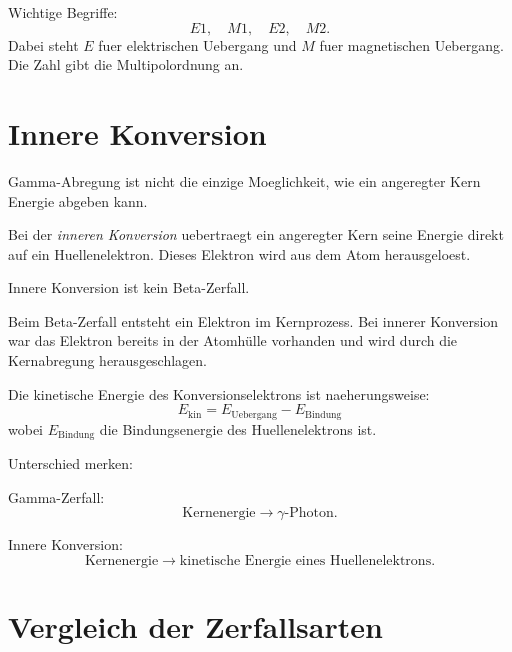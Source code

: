 \begin{examtipbox}
Wichtige Begriffe:
\[
    E1, \quad M1, \quad E2, \quad M2.
\]
Dabei steht $E$ fuer elektrischen Uebergang und $M$ fuer magnetischen Uebergang.
Die Zahl gibt die Multipolordnung an.
\end{examtipbox}

\section{Innere Konversion}

Gamma-Abregung ist nicht die einzige Moeglichkeit, wie ein angeregter Kern Energie
abgeben kann.

\begin{definitionbox}
Bei der \emph{inneren Konversion} uebertraegt ein angeregter Kern seine Energie direkt
auf ein Huellenelektron.
Dieses Elektron wird aus dem Atom herausgeloest.
\end{definitionbox}

\begin{conceptbox}
Innere Konversion ist kein Beta-Zerfall.

Beim Beta-Zerfall entsteht ein Elektron im Kernprozess.
Bei innerer Konversion war das Elektron bereits in der Atomhülle vorhanden und wird
durch die Kernabregung herausgeschlagen.
\end{conceptbox}

\begin{formulabox}
Die kinetische Energie des Konversionselektrons ist naeherungsweise:
\[
    E_{\mathrm{kin}}
    =
    E_{\mathrm{Uebergang}}
    -
    E_{\mathrm{Bindung}}
\]
wobei $E_{\mathrm{Bindung}}$ die Bindungsenergie des Huellenelektrons ist.
\end{formulabox}

\begin{examtipbox}
Unterschied merken:

Gamma-Zerfall:
\[
    \text{Kernenergie} \rightarrow \gamma\text{-Photon}.
\]

Innere Konversion:
\[
    \text{Kernenergie} \rightarrow \text{kinetische Energie eines Huellenelektrons}.
\]
\end{examtipbox}

\section{Vergleich der Zerfallsarten}

